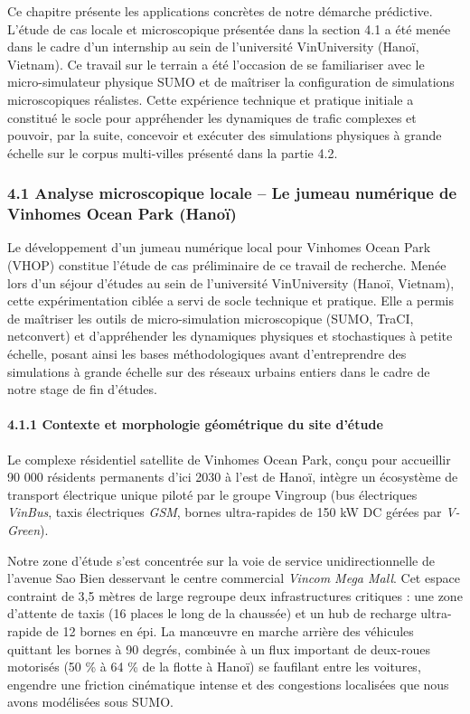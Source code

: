 \documentclass[10pt, a4paper]{article}
\begin{document}
Ce chapitre présente les applications concrètes de notre démarche
prédictive. L'étude de cas locale et microscopique présentée dans la
section 4.1 a été menée dans le cadre d'un internship au sein de
l'université VinUniversity (Hanoï, Vietnam). Ce travail sur le terrain a
été l'occasion de se familiariser avec le micro-simulateur physique SUMO
et de maîtriser la configuration de simulations microscopiques
réalistes. Cette expérience technique et pratique initiale a constitué
le socle pour appréhender les dynamiques de trafic complexes et pouvoir,
par la suite, concevoir et exécuter des simulations physiques à grande
échelle sur le corpus multi-villes présenté dans la partie 4.2.

\subsubsection{4.1 Analyse microscopique locale -- Le jumeau numérique
de Vinhomes Ocean Park
(Hanoï)}\label{analyse-microscopique-locale-le-jumeau-numuxe9rique-de-vinhomes-ocean-park-hanouxef}

Le développement d'un jumeau numérique local pour Vinhomes Ocean Park
(VHOP) constitue l'étude de cas préliminaire de ce travail de recherche.
Menée lors d'un séjour d'études au sein de l'université VinUniversity
(Hanoï, Vietnam), cette expérimentation ciblée a servi de socle
technique et pratique. Elle a permis de maîtriser les outils de
micro-simulation microscopique (SUMO, TraCI, netconvert) et
d'appréhender les dynamiques physiques et stochastiques à petite
échelle, posant ainsi les bases méthodologiques avant d'entreprendre des
simulations à grande échelle sur des réseaux urbains entiers dans le
cadre de notre stage de fin d'études.

\paragraph{4.1.1 Contexte et morphologie géométrique du site
d'étude}\label{contexte-et-morphologie-guxe9omuxe9trique-du-site-duxe9tude}

Le complexe résidentiel satellite de Vinhomes Ocean Park, conçu pour
accueillir 90 000 résidents permanents d'ici 2030 à l'est de Hanoï,
intègre un écosystème de transport électrique unique piloté par le
groupe Vingroup (bus électriques \emph{VinBus}, taxis électriques
\emph{GSM}, bornes ultra-rapides de 150 kW DC gérées par
\emph{V-Green}).

Notre zone d'étude s'est concentrée sur la voie de service
unidirectionnelle de l'avenue Sao Bien desservant le centre commercial
\emph{Vincom Mega Mall}. Cet espace contraint de 3,5 mètres de large
regroupe deux infrastructures critiques : une zone d'attente de taxis
(16 places le long de la chaussée) et un hub de recharge ultra-rapide de
12 bornes en épi. La manœuvre en marche arrière des véhicules quittant
les bornes à 90 degrés, combinée à un flux important de deux-roues
motorisés (50 \% à 64 \% de la flotte à Hanoï) se faufilant entre les
voitures, engendre une friction cinématique intense et des congestions
localisées que nous avons modélisées sous SUMO.
\end{document}
